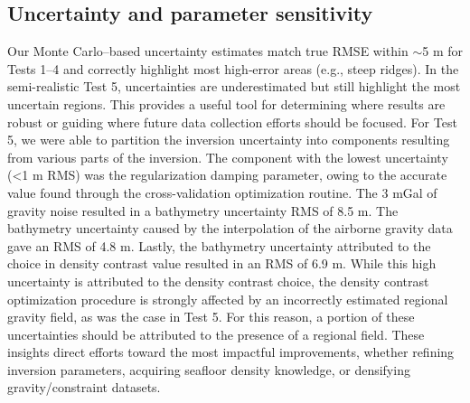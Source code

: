 \documentclass[tc, manuscript]{copernicus}
\begin{document}
\subsection{Uncertainty and parameter sensitivity}
Our Monte Carlo–based uncertainty estimates match true RMSE within $\sim$5 m for Tests 1–4 and correctly highlight most high‐error areas (e.g., steep ridges). In the semi-realistic Test 5, uncertainties are underestimated but still highlight the most uncertain regions. This provides a useful tool for determining where results are robust or guiding where future data collection efforts should be focused. For Test 5, we were able to partition the inversion uncertainty into components resulting from various parts of the inversion. The component with the lowest uncertainty (\textless 1 m RMS) was the regularization damping parameter, owing to the accurate value found through the cross-validation optimization routine. The 3 mGal of gravity noise resulted in a bathymetry uncertainty RMS of 8.5 m. The bathymetry uncertainty caused by the interpolation of the airborne gravity data gave an RMS of 4.8 m. Lastly, the bathymetry uncertainty attributed to the choice in density contrast value resulted in an RMS of 6.9 m. While this high uncertainty is attributed to the density contrast choice, the density contrast optimization procedure is strongly affected by an incorrectly estimated regional gravity field, as was the case in Test 5. For this reason, a portion of these uncertainties should be attributed to the presence of a regional field. These insights direct efforts toward the most impactful improvements, whether refining inversion parameters, acquiring seafloor density knowledge, or densifying gravity/constraint datasets.
\end{document}
